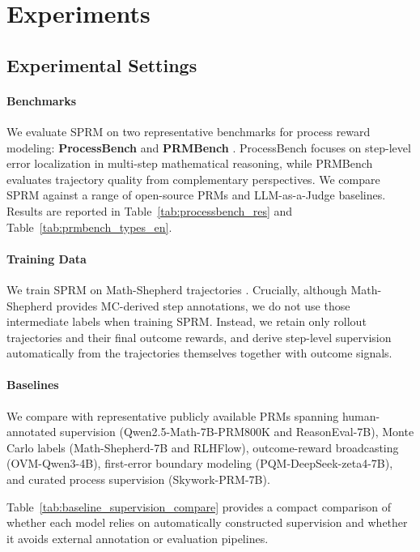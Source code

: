 \section{Experiments}
\subsection{Experimental Settings}
\paragraph{Benchmarks}
We evaluate SPRM on two representative benchmarks for process reward modeling:
\textbf{ProcessBench} \citep{zheng2025processbench}
and \textbf{PRMBench} \citep{DBLP:prmbench}.
ProcessBench focuses on step-level error localization in multi-step mathematical
reasoning, while PRMBench evaluates trajectory quality from complementary
perspectives.
We compare SPRM against a range of open-source PRMs and LLM-as-a-Judge
baselines.
Results are reported in Table~\ref{tab:processbench_res}
and Table~\ref{tab:prmbench_types_en}.

\paragraph{Training Data}
We train SPRM on Math-Shepherd trajectories \citep{wang2024math}.
Crucially, although Math-Shepherd provides MC-derived step annotations, we do
not use those intermediate labels when training SPRM.
Instead, we retain only rollout trajectories and their final outcome rewards,
and derive step-level supervision automatically from the trajectories
themselves together with outcome signals.

\paragraph{Baselines}
We compare with representative publicly available PRMs spanning human-annotated
supervision (Qwen2.5-Math-7B-PRM800K and ReasonEval-7B), Monte Carlo labels
(Math-Shepherd-7B and RLHFlow), outcome-reward broadcasting
(OVM-Qwen3-4B), first-error boundary modeling
(PQM-DeepSeek-zeta4-7B), and curated process supervision
(Skywork-PRM-7B).

Table~\ref{tab:baseline_supervision_compare} provides a compact comparison of
whether each model relies on automatically constructed supervision and whether
it avoids external annotation or evaluation pipelines.

